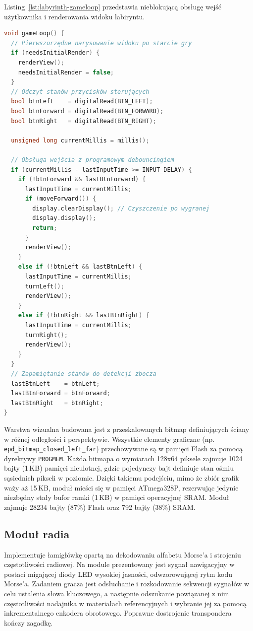 \documentclass{SGGW-thesis}
\begin{document}
Listing~\ref{lst:labyrinth-gameloop} przedstawia nieblokującą obsługę wejść użytkownika i renderowania widoku labiryntu.
\begin{lstlisting}[language=C++, caption={Główna pętla logiczna modułu labiryntu (Labyrinth.ino)}, label={lst:labyrinth-gameloop}]
void gameLoop() {
  // Pierwszorzędne narysowanie widoku po starcie gry
  if (needsInitialRender) {
    renderView();
    needsInitialRender = false;
  }
  // Odczyt stanów przycisków sterujących
  bool btnLeft    = digitalRead(BTN_LEFT);
  bool btnForward = digitalRead(BTN_FORWARD);
  bool btnRight   = digitalRead(BTN_RIGHT);
  
  unsigned long currentMillis = millis();

  // Obsługa wejścia z programowym debouncingiem
  if (currentMillis - lastInputTime >= INPUT_DELAY) {
    if (!btnForward && lastBtnForward) {
      lastInputTime = currentMillis;
      if (moveForward()) {
        display.clearDisplay(); // Czyszczenie po wygranej
        display.display();
        return;
      }
      renderView();
    }
    else if (!btnLeft && lastBtnLeft) {
      lastInputTime = currentMillis;
      turnLeft();
      renderView();
    }
    else if (!btnRight && lastBtnRight) {
      lastInputTime = currentMillis;
      turnRight();
      renderView();
    }
  }
  // Zapamiętanie stanów do detekcji zbocza
  lastBtnLeft    = btnLeft;
  lastBtnForward = btnForward;
  lastBtnRight   = btnRight;
}
\end{lstlisting}

Warstwa wizualna budowana jest z przeskalowanych bitmap definiujących ściany w różnej odległości i perspektywie. Wszystkie elementy graficzne \linebreak (np. \texttt{epd\_bitmap\_closed\_left\_far}) przechowywane są w pamięci Flash za pomocą dyrektywy \texttt{PROGMEM}. Każda bitmapa o wymiarach 128x64 piksele zajmuje 1024 bajty (1\,KB) pamięci nieulotnej, gdzie pojedynczy bajt definiuje stan ośmiu sąsiednich pikseli w poziomie. Dzięki takiemu podejściu, mimo że zbiór grafik waży aż 15\,KB, moduł mieści się w pamięci ATmega328P, rezerwując jedynie niezbędny stały bufor ramki (1\,KB) w pamięci operacyjnej SRAM. Moduł zajmuje 28234 bajty (87\%) Flash oraz 792 bajty (38\%) SRAM.

\subsection{Moduł radia} Implementuje łamigłówkę opartą na dekodowaniu alfabetu Morse'a i strojeniu częstotliwości radiowej. Na module prezentowany jest sygnał nawigacyjny w postaci migającej diody LED wysokiej jasności, odwzorowującej rytm kodu Morse'a. Zadaniem gracza jest odsłuchanie i rozkodowanie sekwencji sygnałów w celu ustalenia słowa kluczowego, a następnie odszukanie powiązanej z nim częstotliwości nadajnika w materiałach referencyjnych i wybranie jej za pomocą inkrementalnego enkodera obrotowego. Poprawne dostrojenie transpondera kończy zagadkę.
\end{document}

